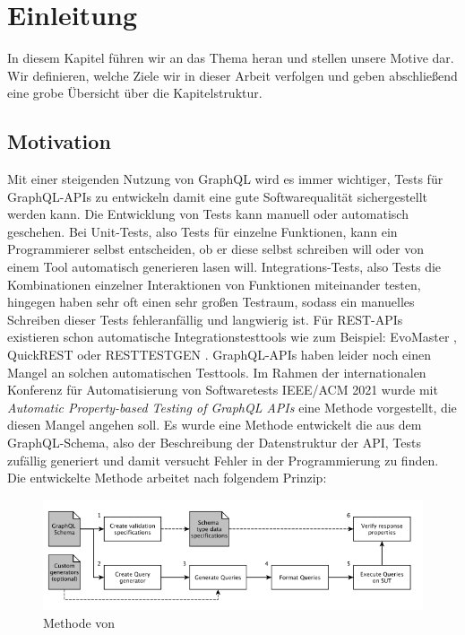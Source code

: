 \chapter{Einleitung}

In diesem Kapitel führen wir an das Thema heran und stellen unsere Motive dar.
Wir definieren, welche Ziele wir in dieser Arbeit verfolgen und geben abschließend eine grobe Übersicht über die
Kapitelstruktur.

\section{Motivation}

Mit einer steigenden Nutzung von GraphQL wird es immer wichtiger, Tests für GraphQL-APIs zu entwickeln damit eine
gute Softwarequalität sichergestellt werden kann.
Die Entwicklung von Tests kann manuell oder automatisch geschehen.
Bei Unit-Tests, also Tests für einzelne Funktionen, kann ein Programmierer selbst entscheiden, ob er diese selbst schreiben will
oder von einem Tool automatisch generieren lasen will.
Integrations-Tests, also Tests die Kombinationen einzelner Interaktionen von Funktionen miteinander testen, hingegen haben sehr oft
einen sehr großen Testraum, sodass ein manuelles Schreiben dieser Tests fehleranfällig und langwierig ist.
Für REST-APIs existieren schon automatische Integrationstesttools wie zum Beispiel: EvoMaster \cite{evo-master} , QuickREST \cite{karlsson2019quickrest} oder RESTTESTGEN \cite{rest-test-gen}.
GraphQL-APIs haben leider noch einen Mangel an solchen automatischen Testtools.
Im Rahmen der internationalen  Konferenz für Automatisierung  von  Softwaretests IEEE/ACM 2021 wurde mit
\textit{Automatic Property-based Testing of GraphQL APIs}\cite{property-based-testing} eine Methode vorgestellt, die diesen Mangel angehen soll.
Es wurde eine Methode entwickelt die aus dem GraphQL-Schema, also der Beschreibung der Datenstruktur der API, Tests zufällig generiert und damit versucht Fehler in der Programmierung zu finden.
Die entwickelte Methode arbeitet nach folgendem Prinzip:

\begin{figure}[h!]
    \centering
    \includegraphics[width=\textwidth,height=\textheight,keepaspectratio]{content/einleitung/toolchain}
    \caption{Methode von~\cite{property-based-testing}}
    \label{property-based-method}
\end{figure}
\newpage

